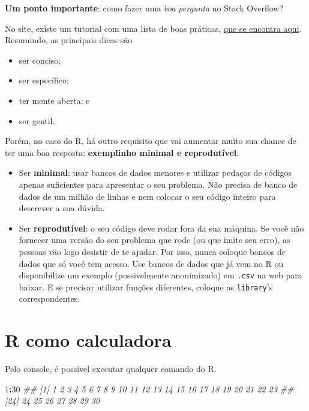 \documentclass[]{book}
\newenvironment{Shaded}{\begin{snugshade}}{\end{snugshade}}
\newcommand{\CommentTok}[1]{\textcolor[rgb]{0.56,0.35,0.01}{\textit{#1}}}
\newcommand{\DecValTok}[1]{\textcolor[rgb]{0.00,0.00,0.81}{#1}}
\newcommand{\OperatorTok}[1]{\textcolor[rgb]{0.81,0.36,0.00}{\textbf{#1}}}
\providecommand{\tightlist}{%
  \setlength{\itemsep}{0pt}\setlength{\parskip}{0pt}}
\begin{document}
\textbf{Um ponto importante}: como fazer uma \emph{boa pergunta} no Stack Overflow?

No site, existe um tutorial com uma lista de boas práticas, \href{http://pt.stackoverflow.com/help/how-to-ask}{que se encontra aqui}. Resumindo, as principais dicas são

\begin{itemize}
\tightlist
\item
  ser conciso;
\item
  ser específico;
\item
  ter mente aberta; e
\item
  ser gentil.
\end{itemize}

Porém, no caso do R, há outro requisito que vai aumentar muito sua chance de ter uma boa resposta: \textbf{exemplinho minimal e reprodutível}.

\begin{itemize}
\item
  Ser \textbf{minimal}: usar bancos de dados menores e utilizar pedaços de códigos apenas suficientes para apresentar o seu problema. Não precisa de banco de dados de um milhão de linhas e nem colocar o seu código inteiro para descrever a sua dúvida.
\item
  Ser \textbf{reprodutível}: o seu código deve rodar fora da sua máquina. Se você não fornecer uma versão do seu problema que rode (ou que imite seu erro), as pessoas vão logo desistir de te ajudar. Por isso, nunca coloque bancos de dados que só você tem acesso. Use bancos de dados que já vem no R ou disponibilize um exemplo (possivelmente anonimizado) em \texttt{.csv} na web para baixar. E se precisar utilizar funções diferentes, coloque as \texttt{library}'s correspondentes.
\end{itemize}

\hypertarget{r-como-calculadora}{%
\section{R como calculadora}\label{r-como-calculadora}}

Pelo console, é possível executar qualquer comando do R.

\begin{Shaded}
\begin{Highlighting}[]
\DecValTok{1}\OperatorTok{:}\DecValTok{30}
\CommentTok{##  [1]  1  2  3  4  5  6  7  8  9 10 11 12 13 14 15 16 17 18 19 20 21 22 23}
\CommentTok{## [24] 24 25 26 27 28 29 30}
\end{Highlighting}
\end{Shaded}
\end{document}
